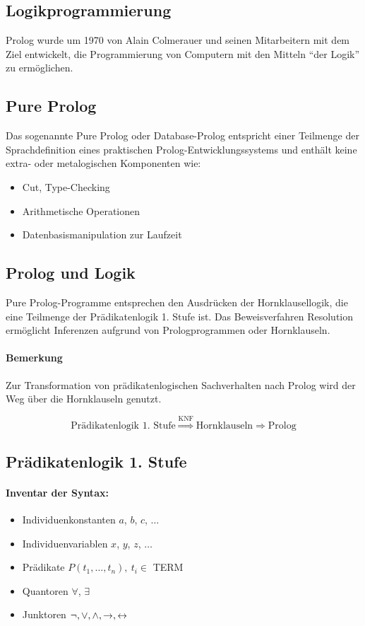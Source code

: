 \documentclass[a4paper,twoside,DIV15,BCOR12mm]{scrbook}
\begin{document}
\subsection{Logikprogrammierung}
Prolog wurde um 1970 von Alain Colmerauer und seinen Mitarbeitern mit dem Ziel entwickelt, die Programmierung von Computern mit den Mitteln "`der Logik"' zu ermöglichen.

\subsection{Pure Prolog}
Das sogenannte Pure Prolog oder Database-Prolog entspricht einer Teilmenge der Sprachdefinition eines praktischen Prolog-Entwicklungssystems und enthält keine extra- oder metalogischen Komponenten wie:
\begin{itemize}
\item Cut, Type-Checking
\item Arithmetische Operationen
\item Datenbasismanipulation zur Laufzeit
\end{itemize}

\subsection{Prolog und Logik}
Pure Prolog-Programme entsprechen den Ausdrücken der Hornklausellogik, die eine Teilmenge der Prädikatenlogik 1. Stufe ist.
Das Beweisverfahren Resolution ermöglicht Inferenzen aufgrund von Prologprogrammen oder Hornklauseln.

\paragraph{Bemerkung}Zur Transformation von prädikatenlogischen Sachverhalten nach Prolog wird der Weg über die Hornklauseln genutzt.

$$\text{Prädikatenlogik 1. Stufe} \stackrel{\text{KNF}}{\Longrightarrow} \text{Hornklauseln} \Longrightarrow \text{Prolog}$$

\subsection{Prädikatenlogik 1. Stufe}
\paragraph{Inventar der Syntax:}
\begin{itemize}
\item Individuenkonstanten $a$, $b$, $c$, $\ldots$
\item Individuenvariablen $x$, $y$, $z$, $\ldots$
\item Prädikate $P(t_1, \ldots, t_n),\ t_i \in$ TERM
\item Quantoren $\forall$, $\exists$
\item Junktoren $\neg, \vee, \wedge, \rightarrow, \leftrightarrow$
\end{itemize}
\end{document}
